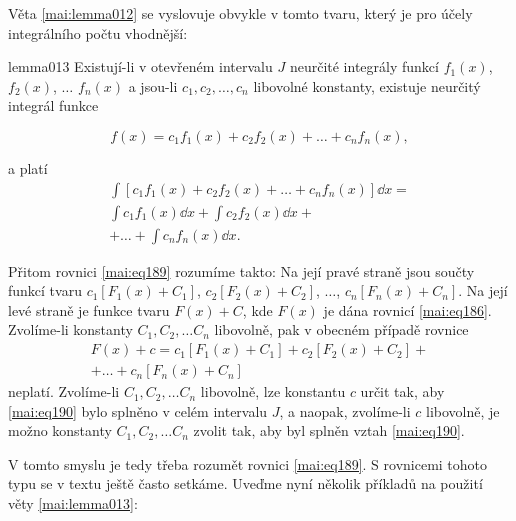       Věta \eqref{mai:lemma012} se vyslovuje obvykle v tomto tvaru, který je pro účely integrálního
      počtu vhodnější:
      \begin{mathlemma}{}{lemma013}       
        Existují-li v otevřeném intervalu \(J\) neurčité integrály funkcí \(f_1(x)\), \(f_2(x)\),
        \(\ldots\) \(f_n(x)\) a jsou-li \(c_1, c_2, \ldots, c_n\) libovolné konstanty, existuje
        neurčitý integrál funkce  
        \begin{fleqn}[0pt]
          \begin{equation}\label{mai:eq188}
            f(x) = c_1f_1(x) + c_2f_2(x) + \ldots + c_nf_n(x),
          \end{equation}
        \end{fleqn}
        a platí
        \begin{multline}\label{mai:eq189}
          \int[c_1f_1(x) + c_2f_2(x) + \ldots + c_nf_n(x)]\dd{x}  =    \\   
          \int{c_1f_1(x)}\dd{x} + \int{c_2f_2(x)}\dd{x} +              \\
          + \ldots + \int{c_nf_n(x)}\dd{x}.
        \end{multline}
      \end{mathlemma}
      Přitom rovnici \eqref{mai:eq189} rozumíme takto: Na její pravé straně jsou součty funkcí tvaru
      \(c_1[F_1(x) + C_1]\), \(c_2[F_2(x) + C_2]\), \(\ldots\), \(c_n[F_n(x) + C_n]\). Na její levé
      straně je funkce tvaru \(F(x)+C\), kde \(F(x)\) je dána rovnicí \eqref{mai:eq186}. Zvolíme-li
      konstanty \(C_1, C_2, \ldots C_n\) libovolně, pak v obecném případě rovnice 
      \begin{multline}\label{mai:eq190}
        F(x) + c = c_1[F_1(x) + C_1] + c_2[F_2(x) + C_2] +\\ 
             + \ldots + c_n[F_n(x) + C_n]
      \end{multline}
      neplatí. Zvolíme-li \(C_1, C_2, \ldots C_n\) libovolně, lze konstantu \(c\) určit tak, aby
      \eqref{mai:eq190} bylo splněno v celém intervalu \(J\), a naopak, zvolíme-li \(c\) libovolně,
      je možno konstanty \(C_1, C_2, \ldots C_n\) zvolit tak, aby byl splněn vztah
      \eqref{mai:eq190}. 

      V tomto smyslu je tedy třeba rozumět rovnici \eqref{mai:eq189}. S rovnicemi tohoto typu se v
      textu ještě často setkáme. Uveďme nyní několik příkladů na použití věty \eqref{mai:lemma013}:
      
      
      
      
      

